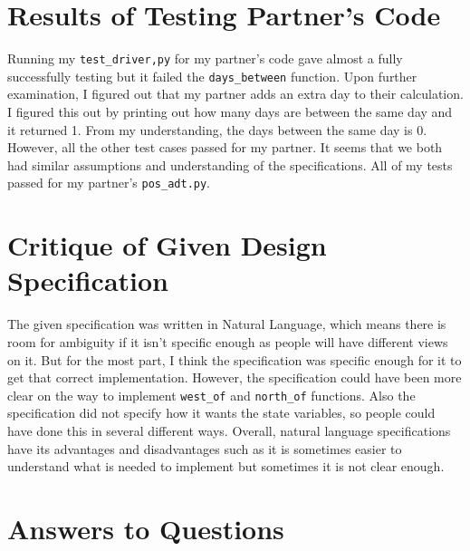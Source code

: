 \documentclass[12pt]{article}
\begin{document}
\section{Results of Testing Partner's Code}

Running my \texttt{test\_driver,py} for my partner's code gave almost a fully successfully testing but it failed the \texttt{days\_between} function. Upon further examination, I figured out that my partner adds an extra day to their calculation. I figured this out by printing out how many days are between the same day and it returned 1. From my understanding, the days between the same day is 0. However, all the other test cases passed for my partner. It seems that we both had similar assumptions and understanding of the specifications. All of my tests passed for my partner's \texttt{pos\_adt.py}.

\section{Critique of Given Design Specification}

The given specification was written in Natural Language, which means there is room for ambiguity if it isn't specific enough as people will have different views on it. But for the most part, I think the specification was specific enough for it to get that correct implementation. However, the specification could have been more clear on the way to implement \texttt{west\_of} and \texttt{north\_of} functions. Also the specification did not specify how it wants the state variables, so people could have done this in several different ways. Overall, natural language specifications have its advantages and disadvantages such as it is sometimes easier to understand what is needed to implement but sometimes it is not clear enough.

\section{Answers to Questions}
\end{document}
